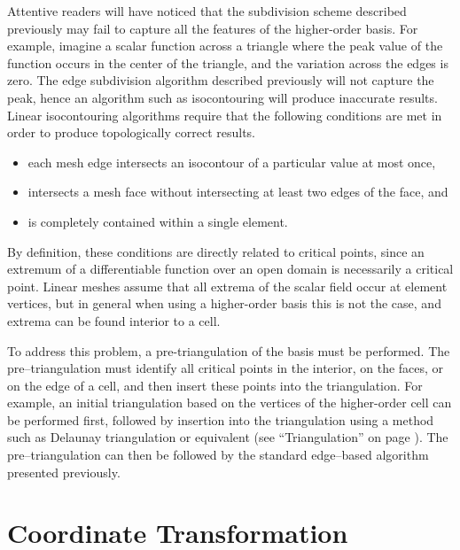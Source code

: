 Attentive readers will have noticed that the subdivision scheme described previously may fail to capture all the features of the higher-order basis. For example, imagine a scalar function across a triangle where the peak value of the function occurs in the center of the triangle, and the variation across the edges is zero. The edge subdivision algorithm described previously will not capture the peak, hence an algorithm such as isocontouring will produce inaccurate results. Linear isocontouring algorithms require that the following conditions are met in order to produce topologically correct results.

\begin{itemize}

\item each mesh edge intersects an isocontour of a particular value at most once,

\item intersects a mesh face without intersecting at least two edges of the face, and

\item is completely contained within a single element.

\end{itemize}

By definition, these conditions are directly related to critical points, since an extremum of a differentiable function over an open domain is necessarily a critical point. Linear meshes assume that all extrema of the scalar field occur at element vertices, but in general when using a higher-order basis this is not the case, and extrema can be found interior to a cell.

To address this problem, a pre-triangulation of the basis must be performed. The pre--triangulation must identify all critical points in the interior, on the faces, or on the edge of a cell, and then insert these points into the triangulation. For example, an initial triangulation based on the vertices of the higher-order cell can be performed first, followed by insertion into the triangulation using a method such as Delaunay triangulation or equivalent (see ``Triangulation'' on page \pageref{subsec:decimation.triangulation}). The pre--triangulation can then be followed by the standard edge--based algorithm presented previously.

\section{Coordinate Transformation}

